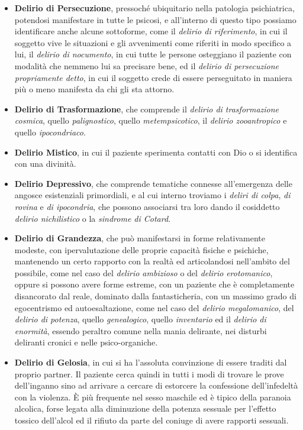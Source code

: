 \documentclass[]{article}
\begin{document}
\begin{itemize}
\item
  \textbf{Delirio di Persecuzione}, pressoché ubiquitario nella
  patologia psichiatrica, potendosi manifestare in tutte le psicosi, e
  all'interno di questo tipo possiamo identificare anche alcune
  sottoforme, come il \emph{delirio di riferimento}, in cui il soggetto
  vive le situazioni e gli avvenimenti come riferiti in modo specifico a
  lui, il \emph{delirio di nocumento}, in cui tutte le persone
  osteggiano il paziente con modalità che nemmeno lui sa precisare bene,
  ed il \emph{delirio di persecuzione propriamente detto}, in cui il
  soggetto crede di essere perseguitato in maniera più o meno manifesta
  da chi gli sta attorno.
\item
  \textbf{Delirio di Trasformazione}, che comprende il \emph{delirio di
  trasformazione cosmica}, quello \emph{palignostico}, quello
  \emph{metempsicotico}, il \emph{delirio zooantropico} e quello
  \emph{ipocondriaco}.
\item
  \textbf{Delirio Mistico}, in cui il paziente sperimenta contatti con
  Dio o si identifica con una divinità.
\item
  \textbf{Delirio Depressivo}, che comprende tematiche connesse
  all'emergenza delle angosce esistenziali primordiali, e al cui interno
  troviamo i \emph{deliri di colpa}, \emph{di rovina} e \emph{di
  ipocondria}, che possono associarsi tra loro dando il cosiddetto
  \emph{delirio nichilistico} o la \emph{sindrome di Cotard}.
\item
  \textbf{Delirio di Grandezza}, che può manifestarsi in forme
  relativamente modeste, con ipervalutazione delle proprie capacità
  fisiche e psichiche, mantenendo un certo rapporto con la realtà ed
  articolandosi nell'ambito del possibile, come nel caso del
  \emph{delirio ambizioso} o del \emph{delirio} \emph{erotomanico},
  oppure si possono avere forme estreme, con un paziente che è
  completamente disancorato dal reale, dominato dalla fantasticheria,
  con un massimo grado di egocentrismo ed autoesaltazione, come nel caso
  del \emph{delirio megalomanico}, del \emph{delirio di potenza}, quello
  \emph{genealogico}, quello \emph{inventario} ed il \emph{delirio di
  enormità}, essendo peraltro comune nella mania delirante, nei disturbi
  deliranti cronici e nelle psico-organiche.
\item
  \textbf{Delirio di Gelosia}, in cui si ha l'assoluta convinzione di
  essere traditi dal proprio partner. Il paziente cerca quindi in tutti
  i modi di trovare le prove dell'inganno sino ad arrivare a cercare di
  estorcere la confessione dell'infedeltà con la violenza. È più
  frequente nel sesso maschile ed è tipico della paranoia alcolica,
  forse legata alla diminuzione della potenza sessuale per l'effetto
  tossico dell'alcol ed il rifiuto da parte del coniuge di avere
  rapporti sessuali.
\end{itemize}
\end{document}
